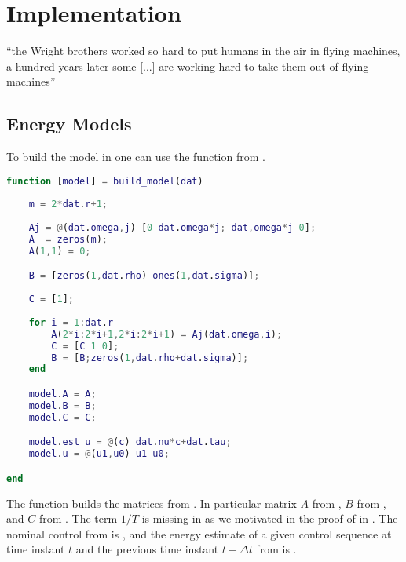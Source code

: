 
\chapter{\color{red}Implementation}
\label{app:imp}

\begin{chapquote}{\cite{anderson2005introduction}}
    ``the Wright brothers worked so hard to put humans in the air in flying machines, a hundred years later some [...] are working hard to take them out of flying machines''
\end{chapquote}
  
\vspace*{1em}



\section{Energy Models}

To build the model in \matlab one can use the function  from .

\begin{lstlisting}[language=Matlab,caption={[Function to create the energy model]Function \stt{build\_model} that creates the energy model.},captionpos=b,label=lst:build_model]
function [model] = build_model(dat)
    
    m = 2*dat.r+1;
    
    Aj = @(dat.omega,j) [0 dat.omega*j;-dat,omega*j 0];
    A  = zeros(m);
    A(1,1) = 0;

    B = [zeros(1,dat.rho) ones(1,dat.sigma)];
        
    C = [1];
    
    for i = 1:dat.r
        A(2*i:2*i+1,2*i:2*i+1) = Aj(dat.omega,i); 
        C = [C 1 0];
        B = [B;zeros(1,dat.rho+dat.sigma)];
    end

    model.A = A;
    model.B = B;
    model.C = C;

    model.est_u = @(c) dat.nu*c+dat.tau;
    model.u = @(u1,u0) u1-u0;

end
\end{lstlisting}

The function builds the matrices from . In particular matrix $A$ from , $B$ from , and $C$ from . The term $1/T$ is missing in  as we motivated in the proof of  in . The nominal control from  is , and the energy estimate of a given control sequence at time instant $t$ and the previous time instant $t-\Delta t$ from  is . 

